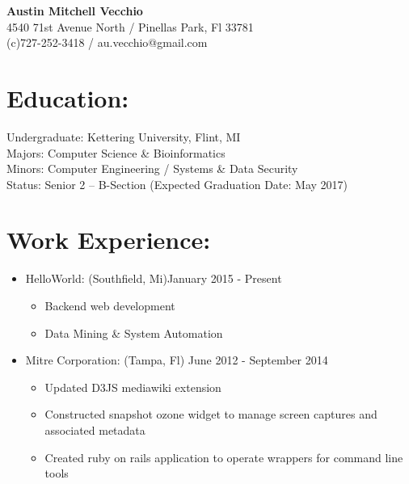 \documentclass{res}
\begin{document}
\begin{center}
\LARGE{\textbf{Austin Mitchell Vecchio}}\\
\normalsize{
4540 71st Avenue North / Pinellas Park, Fl 33781\\
(c)727-252-3418 / au.vecchio@gmail.com
}
\end{center}

\section{Education:}
Undergraduate: Kettering University, Flint, MI\\
Majors: Computer Science \& Bioinformatics\\
Minors: Computer Engineering / Systems \& Data Security\\
Status: Senior 2 – B-Section (Expected Graduation Date: May 2017)

\section{Work Experience:}
\begin{itemize}[leftmargin=*]
\item HelloWorld: (Southfield, Mi)\hfill January 2015 - Present
\begin{itemize}[label=$\circ$]
\item Backend web development
\item Data Mining \& System Automation
\end{itemize}
\item Mitre Corporation: (Tampa, Fl) \hfill June 2012 - September 2014
\begin{itemize}[label=$\circ$]
\item Updated D3JS mediawiki extension
\item Constructed snapshot ozone widget to manage screen captures and associated metadata
\item Created ruby on rails application to operate wrappers for command line tools
\end{itemize}
\end{itemize}
\end{document}

